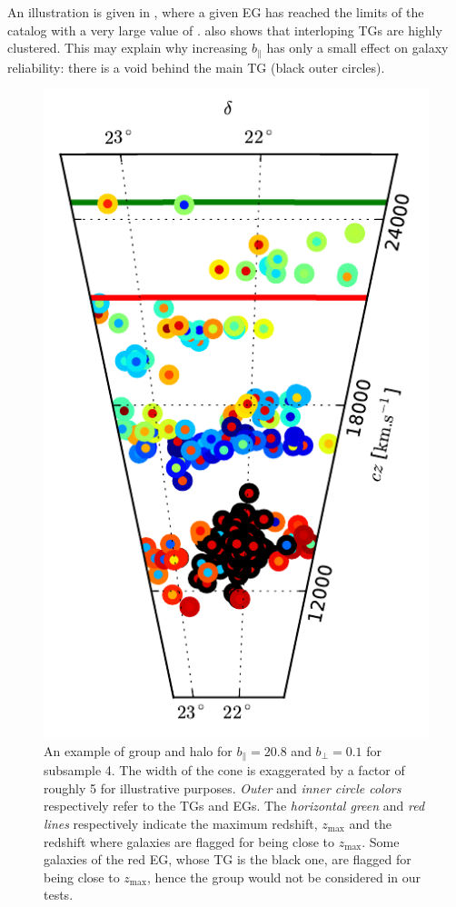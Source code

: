 An illustration is given in , where a given EG has
reached the limits of the catalog with a very large value of \bpar{}.
 also shows that interloping TGs are highly clustered.
This may explain why increasing $b_\parallel$ has only a small effect on
galaxy reliability: there is a void behind the main TG (black outer
circles).
%
\begin{figure}
    \centering
    \includegraphics[width=0.3\textheight]{figures/fof/group_halo.pdf}
    \caption{An example of group and halo for $b_\parallel=20.8$ and
        $b_\bot=0.1$ for subsample 4. The width of the cone is  exaggerated by
        a factor of roughly 5 for illustrative purposes. \emph{Outer} and
        \emph{inner circle colors} respectively refer to the TGs and EGs. The
        \emph{horizontal green} and \emph{red lines} respectively indicate the
        maximum redshift, $z_{\max}$ and the redshift where galaxies are
        flagged for being close to $z_{\max}$. Some galaxies of the red EG,
    whose TG is the black one, are flagged for being close to $z_{\max}$, hence
the group would not be considered in our tests.\label{fig:group}}
\end{figure}
%

